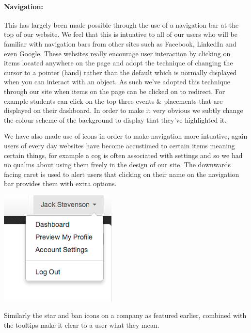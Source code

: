     \paragraph{Navigation:} This has largely been made possible through the use of a navigation bar at the top of our website. We feel that this is intuative to all of our users who will be familiar with navigation bars from other sites such as Facebook\cite{facebook}, LinkedIn\cite{linkedin} and even Google\cite{google}. These websites really encourage user interaction by clicking on items located anywhere on the page and adopt the technique of changing the cursor to a pointer (hand) rather than the default which is normally displayed when you can interact with an object. As such we've adopted this technique through our site when items on the page can be clicked on to redirect. For example students can click on the top three events \& placements that are displayed on their dashboard. In order to make it very obvious we subtly change the colour scheme of the background to display that they've highlighted it.

    We have also made use of icons in order to make navigation more intuative, again users of every day websites have become accustimed to certain items meaning certain things, for example a cog is often associated with settings and so we had no qualms about using them freely in the design of our site.
    The downwards facing caret is used to alert users that clicking on their name on the navigation bar provides them with extra options.
    
    \begin{center}
    \includegraphics[scale=0.5]{images/design/navigation_caret}
    \end{center}

    Similarly the star and ban icons on a company as featured earlier, combined with the tooltips make it clear to a user what they mean.